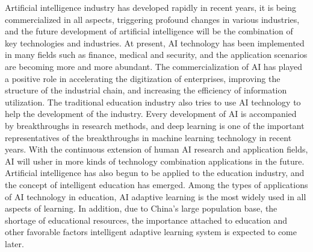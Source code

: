 
Artificial intelligence industry has developed rapidly in recent years, it is being commercialized in all aspects, triggering profound changes in various industries, and the future development of artificial intelligence will be the combination of key technologies and industries.\cite{cui2018performance,vinuesa2020role} At present, AI technology has been implemented in many fields such as finance, medical and security, and the application scenarios are becoming more and more abundant. The commercialization of AI has played a positive role in accelerating the digitization of enterprises, improving the structure of the industrial chain, and increasing the efficiency of information utilization. The traditional education industry also tries to use AI technology to help the development of the industry. Every development of AI is accompanied by breakthroughs in research methods, and deep learning is one of the important representatives of the breakthroughs in machine learning technology in recent years. With the continuous extension of human AI research and application fields, AI will usher in more kinds of technology combination applications in the future. Artificial intelligence has also begun to be applied to the education industry, and the concept of intelligent education has emerged. Among the types of applications of AI technology in education, AI adaptive learning is the most widely used in all aspects of learning. In addition, due to China's large population base, the shortage of educational resources, the importance attached to education and other favorable factors intelligent adaptive learning system is expected to come later.

